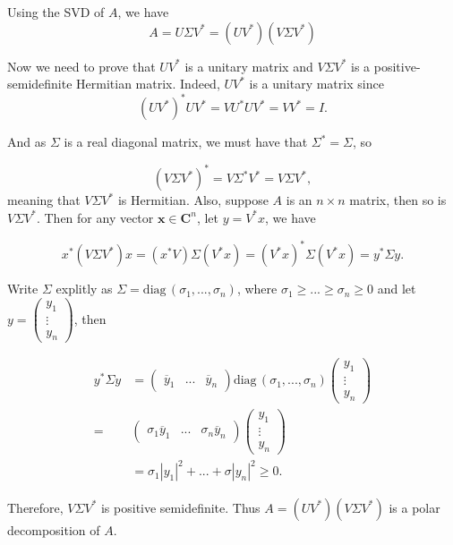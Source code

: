 Using the SVD of $A$, we have $$A = U\Sigma V^* = (UV^*)(V \Sigma V^*)$$

Now we need to prove that $UV^*$ is a unitary matrix and $V \Sigma V^*$ is a positive-semidefinite Hermitian matrix. Indeed, $UV^*$ is a unitary matrix since 
$$(UV^*)^*UV^* = VU^*UV^* = VV^* = I.$$

And as $\Sigma$ is a real diagonal matrix, we must have that $\Sigma^* = \Sigma$, so

$$(V\Sigma V^*)^* = V\Sigma^* V^* = V\Sigma V^*,$$
meaning that $V \Sigma V^*$ is Hermitian. Also, suppose $A$ is an $n\times n$ matrix, then so is $V \Sigma V^*$. Then for any vector $\mathbf{x}\in\mathbf{C}^n$, let $y = V^*x$, we have

$$x^*(V \Sigma V^*)x = (x^*V)\Sigma(V^*x) = (V^*x)^*\Sigma (V^*x) = y^*\Sigma y.$$

Write $\Sigma$ explitly as $\Sigma = \mathrm{diag}\,(\sigma_1,...,\sigma_n)$, where $\sigma_1\ge...\ge\sigma_n\ge 0$ and let $y = 
\begin{pmatrix}
    y_1 \\ \vdots \\ y_n
\end{pmatrix}$, then 

\begin{align*}
   y^*\Sigma y &= 
\begin{pmatrix}
    \overline{y}_1 & ... & \overline{y}_n
\end{pmatrix}
\mathrm{diag}\,(\sigma_1,...,\sigma_n)
\begin{pmatrix}
    y_1 \\ \vdots \\ y_n
\end{pmatrix}\\
=& \begin{pmatrix}
    \sigma_1 \overline{y}_1 & ... & \sigma_n \overline{y}_n
\end{pmatrix}
\begin{pmatrix}
    y_1 \\ \vdots \\ y_n
\end{pmatrix}\\
&= \sigma_1|y_1|^2+...+\sigma|y_n|^2 \ge 0.
\end{align*}

Therefore, $V\Sigma V^*$ is positive semidefinite. Thus $A = (UV^*)(V \Sigma V^*)$ is a polar decomposition of $A$.










